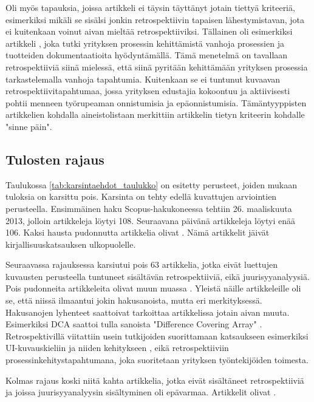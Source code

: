 Oli myös tapauksia, joissa artikkeli ei täysin täyttänyt jotain tiettyä kriteeriä, esimerkiksi mikäli se sisälsi jonkin retrospektiivin tapaisen lähestymistavan, jota ei kuitenkaan voinut aivan mieltää retrospektiiviksi. Tällainen oli esimerkiksi artikkeli \citep{cook1998cost}, joka tutki yrityksen prosessin kehittämistä vanhoja prosessien ja tuotteiden dokumentaatioita hyödyntämällä. Tämä menetelmä on tavallaan retrospektiiviä siinä mielessä, että siinä pyritään kehittämään yrityksen prosessia tarkastelemalla vanhoja tapahtumia. Kuitenkaan se ei tuntunut kuvaavan retrospektiivitapahtumaa, jossa yrityksen edustajia kokoontuu ja aktiivisesti pohtii menneen työrupeaman onnistumisia ja epäonnistumisia. Tämäntyyppisten artikkelien kohdalla aineistolistaan merkittiin artikkelin tietyn kriteerin kohdalle "sinne päin". 

\subsection{Tulosten rajaus}
Taulukossa \ref{tab:karsintaehdot_taulukko} on esitetty perusteet, joiden mukaan tuloksia on karsittu pois. Karsinta on tehty edellä kuvattujen arviointien perusteella. Ensimmäinen haku Scopus-hakukoneessa tehtiin 26. maaliskuuta 2013, jolloin artikkeleja löytyi 108. Seuraavana päivänä artikkeleja löytyi enää 106. Kaksi hausta pudonnutta artikkelia olivat \citep{bolosky2007farsite, dreiseitl2005nomographic}. Nämä artikkelit jäivät kirjallisuuskatsauksen ulkopuolelle.

Seuraavassa rajauksessa karsiutui pois 63 artikkelia, jotka eivät luettujen kuvausten perusteella tuntuneet sisältävän retrospektiiviä, eikä juurisyyanalyysiä. Pois pudonneita artikkeleita olivat muun muassa \citep{yang2012personalized, ji2010constructions, helms2008retrospective, richardson2006developing}. Yleistä näille artikkeleille oli se, että niissä ilmaantui jokin hakusanoista, mutta eri merkityksessä. Hakusanojen lyhenteet saattoivat tarkoittaa artikkelissa jotain aivan muuta. Esimerkiksi DCA saattoi tulla sanoista "Difference Covering Array" \citep{ji2010constructions}. Retrospektivillä viitattiin usein tutkijoiden suorittamaan katsaukseen esimerkiksi UI-kuvauskieliin ja niiden kehitykseen \citep{helms2008retrospective}, eikä retrospektiiviin prosessinkehitystapahtumana, joka suoritetaan yrityksen työntekijöiden toimesta.

Kolmas rajaus koski niitä kahta artikkelia, jotka eivät sisältäneet retrospektiiviä ja joissa juurisyyanalyysin sisältyminen oli epävarmaa. Artikkelit olivat \citep{anquetil2007software, wang2004strider}.

